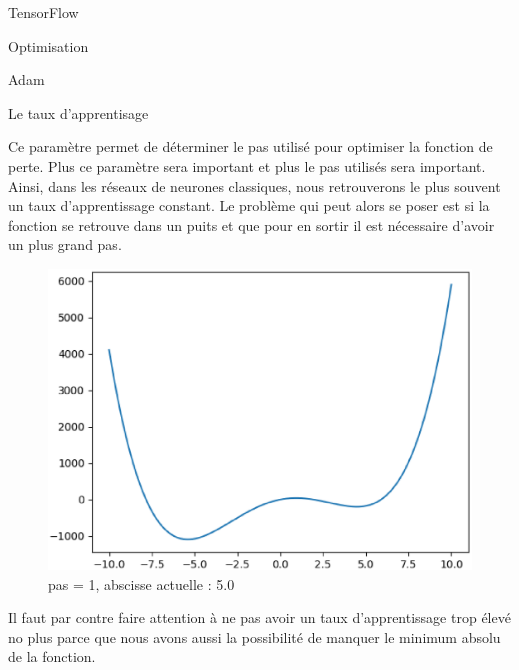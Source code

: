 \documentclass{book}
\newcommand{\p}{\vspace{0.2cm}}
\begin{document}
\begin{chapter}{TensorFlow}
\begin{section}{Optimisation}
\begin{subsection}{Adam}
			\end{subsection}

		\end{section}

		\begin{section}{Le taux d'apprentisage}

			Ce paramètre permet de déterminer le pas utilisé pour optimiser la fonction de perte. Plus ce paramètre sera important et plus le pas utilisés sera important. Ainsi, dans les réseaux de neurones classiques, nous retrouverons le plus souvent un taux d'apprentissage constant. Le problème qui peut alors se poser est si la fonction se retrouve dans un puits et que pour en sortir il est nécessaire d'avoir un plus grand pas.
			\begin{figure}
				\includegraphics[scale=0.7]{annex/exemp}
				\caption{pas = 1, abscisse actuelle : 5.0}
				\label{exemple}
			\end{figure}\p

			Il faut par contre faire attention à ne pas avoir un taux d'apprentissage trop élevé no plus parce que nous avons aussi la possibilité de manquer le minimum absolu de la fonction.\p


\end{section}
\end{chapter}
\end{document}
